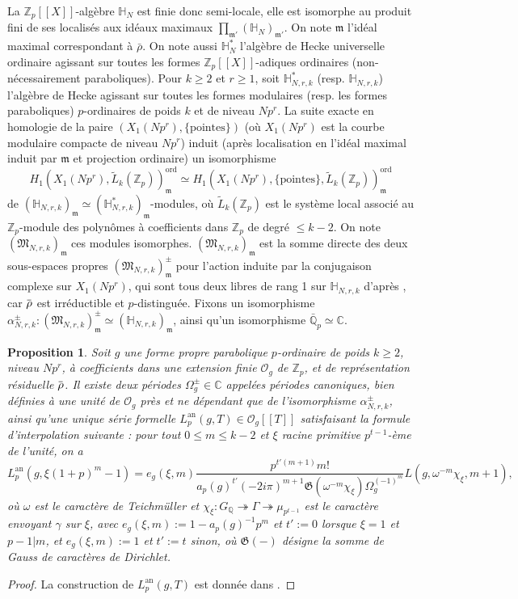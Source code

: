 \documentclass[12pt]{amsart}
\newcommand\bC{\mathbb{C}}
\newcommand\bQ{\mathbb{Q}}
\newcommand\bH{\mathbb{H}}
\newcommand\Zp{{\mathbb{Z}_{p}}}
\newcommand\cO{\mathcal{O}}
\newcommand\gm{\mathfrak{m}}
\newcommand\gG{\mathfrak{G}}
\newcommand\gM{\mathfrak{M}}
\newcommand{\ob}[1]{\mkern 1.5mu\overline{\mkern-1.5mu#1\mkern-1.5mu}\mkern 1.5mu}
\newcommand{\an}{\textrm{an}}
\theoremstyle{defstyle}
\theoremstyle{thmstyle}
\newtheorem{proposition}[subsubsection]{Proposition}
\begin{document}
La $\Zp[[X]]$-algèbre $\bH_N$ est finie donc semi-locale, elle est isomorphe au produit fini de ses localisés aux idéaux maximaux $\prod_{\gm'}\left(\bH_N\right)_{\gm'}$. On note $\gm$ l'idéal maximal correspondant à $\bar{\rho}$. On note aussi $\bH_N^*$ l'algèbre de Hecke universelle ordinaire agissant sur toutes les formes $\Zp[[X]]$-adiques ordinaires (non-nécessairement paraboliques). Pour $k\geq 2$ et $r\geq 1$, soit $\bH^*_{N,r,k}$ (resp. $\bH_{N,r,k}$) l'algèbre de Hecke agissant sur toutes les formes modulaires (resp. les formes paraboliques) $p$-ordinaires de poids $k$ et de niveau $Np^r$. La suite exacte en homologie de la paire $(X_1(Np^r),\{\textrm{pointes}\})$ (où $X_1(Np^r)$ est la courbe modulaire compacte de niveau $Np^r$) induit (après localisation en l'idéal maximal induit par $\gm$ et projection ordinaire) un isomorphisme 
$$H_1(X_1(Np^r),\tilde{L}_k(\Zp))_\gm^\textrm{ord} \simeq H_1(X_1(Np^r),\{\textrm{pointes}\},\tilde{L}_k(\Zp))_\gm^\textrm{ord}$$
de $\left(\bH_{N,r,k}\right)_\gm\simeq \left(\bH^*_{N,r,k}\right)_\gm$-modules, où $\tilde{L}_k(\Zp)$ est le système local associé au $\Zp$-module des polynômes à coefficients dans $\Zp$ de degré $\leq k-2$. On note $\left(\gM_{N,r,k}\right)_\gm$ ces modules isomorphes. $\left(\gM_{N,r,k}\right)_\gm$ est la somme directe des deux sous-espaces propres $\left(\gM_{N,r,k}\right)_\gm^\pm$ pour l'action induite par la conjugaison complexe sur $X_1(Np^r)$, qui sont tous deux libres de rang 1 sur $\bH_{N,r,k}$ d'après \cite[Proposition 3.1.1]{emerton2006variation}, car $\ob{\rho}$ est irréductible et $p$-distinguée. Fixons un isomorphisme $\alpha_{N,r,k}^\pm : \left(\gM_{N,r,k}\right)_\gm^\pm \simeq \left(\bH_{N,r,k}\right)_\gm$, ainsi qu'un isomorphisme $\bar{\bQ}_p\simeq \bC$. 

\begin{proposition}\label{prop:fonction_L_p_adique_poids_k}
	Soit $g$ une forme propre parabolique $p$-ordinaire de poids $k\geq 2$, niveau $Np^r$, à coefficients dans une extension finie $\cO_g$ de $\Zp$, et de représentation résiduelle $\ob{\rho}$. Il existe deux périodes $\Omega_g^\pm\in \bC$ appelées périodes canoniques, bien définies à une unité de $\cO_g$ près et ne dépendant que de l'isomorphisme $\alpha_{N,r,k}^\pm$, ainsi qu'une unique série formelle $L^\an_p(g,T)\in \cO_g[[T]]$ satisfaisant la formule d'interpolation suivante : pour tout $0 \leq m \leq k-2$ et $\xi$ racine primitive $p^{t-1}$-ème de l'unité, on a 
	$$L^\an_p(g,\xi(1+p)^m-1) = e_g(\xi,m) \dfrac{p^{t'(m+1)} m!}{a_p(g)^{t'} (-2i\pi)^{m+1}\gG(\omega^{-m} \chi_\xi) \Omega_g^{(-1)^m}} L(g,\omega^{-m} \chi_\xi,m+1),$$
	où $\omega$ est le caractère de Teichmüller et $\chi_\xi : G_\bQ \twoheadrightarrow \Gamma \twoheadrightarrow \mu_{p^{t-1}}$ est le caractère envoyant $\gamma$ sur $\xi$, avec $e_g(\xi,m):=1-a_p(g)^{-1}p^m$ et $t':=0$ lorsque $\xi=1$ et $p-1|m$, et $e_g(\xi,m):=1$ et $t':=t$ sinon, où $\gG(-)$ désigne la somme de Gauss de caractères de Dirichlet.
\end{proposition} 
\begin{proof}
	La construction de $L^\an_p(g,T)$ est donnée dans \cite[§3.2 et Prop. 3.4.3]{emerton2006variation}. 
\end{proof}
\end{document}
